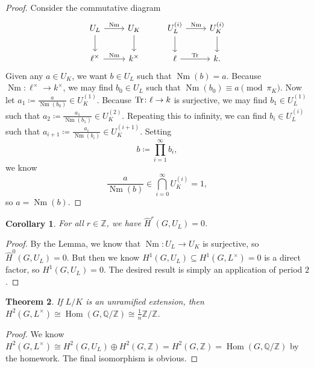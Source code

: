 \documentclass[leqno, openany]{memoir}
\newtheorem{thm}{Theorem}[section]
\newtheorem{cor}[thm]{Corollary}
\theoremstyle{definition}
\theoremstyle{remark}
\theoremstyle{plain}
\theoremstyle{definition}
\theoremstyle{remark}
\newcommand{\Z}{\mathbb{Z}}
\newcommand{\Q}{\mathbb{Q}}
\newcommand{\wh}[1]{\widehat{#1}}
\DeclareMathOperator{\Hom}{Hom}
\DeclareMathOperator{\Nm}{Nm}
\begin{document}
\begin{proof}
    Consider the commutative diagram
    \begin{equation*}
    \begin{tikzcd}
        U_L \ar{r}{\Nm} \ar{d} & U_K \ar{d} & U_L^{(i)} \ar{r}{\Nm} \ar{d} & U_K^{(i)} \ar{d} \\
        \ell^{\times} \ar{r}{\Nm} & k^{\times} & \ell \ar{r}{\Tr} & k.
    \end{tikzcd}
    \end{equation*}
    Given any $a \in U_K$, we want $b \in U_L$ such that $\Nm(b) = a$. Because $\Nm \colon \ell^{\times} \to k^{\times}$, we may find $b_0 \in U_L$ such that $\Nm(b_0) \equiv a \pmod {\pi_K}$. Now let $a_1 \coloneqq \frac{a}{\Nm(b_0)} \in U_K^{(1)}$. Because $\Tr \colon \ell \to k$ is surjective, we may find $b_1 \in U_L^{(1)}$ such that $a_2 \coloneqq \frac{a_1}{\Nm(b_1)} \in U_K^{(2)}$. Repeating this to infinity, we can find $b_i \in U_L^{(i)}$ such that $a_{i+1} \coloneqq \frac{a_i}{\Nm(b_i)} \in U_K^{(i+1)}$. Setting 
    \[ b \coloneqq \prod_{i=1}^{\infty} b_i, \] 
    we know 
    \[ \frac{a}{\Nm(b)} \in \bigcap_{i=0}^{\infty}U_K^{(i)} = \qty{1}, \] 
    so $a = \Nm(b)$.
\end{proof}

\begin{cor}
    For all $r \in \Z$, we have $\wh{H}^r(G, U_L) = 0$.
\end{cor}

\begin{proof}
    By the Lemma, we know that $\Nm \colon U_L \to U_K$ is surjective, so $\wh{H}^0(G, U_L) = 0$. But then we know $H^1(G, U_L) \subseteq H^1(G, L^{\times}) = 0$ is a direct factor, so $H^1(G, U_L) = 0$. The desired result is simply an application of period $2$.
\end{proof}

\begin{thm}
    If $L/K$ is an unramified extension, then $H^2(G, L^{\times}) \cong \Hom(G, \Q/\Z) \cong \frac{1}{n} \Z / \Z$.
\end{thm}

\begin{proof}
    We know $H^2(G, L^{\times}) \cong H^2(G, U_L) \oplus H^2(G, \Z) = H^2(G, \Z) = \Hom(G, \Q/\Z)$ by the homework. The final isomorphism is obvious.
\end{proof}
\end{document}
